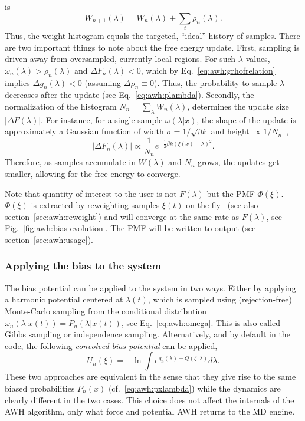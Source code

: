 is
\begin{equation}\label{eq:awh:w-update}
W_{n+1}(\lambda) = W_n(\lambda) + \sum_t\rho_n(\lambda).
\end{equation}
Thus, the weight histogram equals the targeted, ``ideal'' history of samples.
There are two important things to note about the free energy update.
First, sampling is driven away from oversampled, currently local regions.
For such $\lambda$ values, 
 $\omega_n(\lambda) > \rho_n(\lambda)$ and
$\Delta F_n(\lambda) < 0$,
which by Eq.~\ref{eq:awh:grhofrelation} implies 
$\Delta g_n(\lambda) < 0$
(assuming $\Delta \rho_n \equiv 0$).
Thus, the probability to sample  $\lambda$ decreases after the update (see Eq.~\ref{eq:awh:plambda}).
Secondly, the  normalization of the histogram $N_n=\sum_\lambda W_n(\lambda)$, determines the update size $|\Delta F(\lambda)|$.
For instance, for a single sample $\omega(\lambda|x)$, the shape of the  update is approximately a Gaussian function
of width $\sigma=1/\sqrt{\beta k}$ and height $\propto 1/N_n$~\cite{lindahl2014accelerated},
\begin{equation}\label{eq:awh:dfsize}
|\Delta F_n(\lambda)| \propto \frac{1}{N_n} e^{-\frac{1}{2} \beta k (\xi(x) - \lambda)^2}.
\end{equation}
Therefore, as samples accumulate in $W(\lambda)$ and $N_n$ grows, the updates get smaller, allowing for the free energy to converge.

Note that quantity of interest to the user is not $F(\lambda)$ but the PMF $\Phi(\xi)$.
$\Phi(\xi)$ is extracted by reweighting samples $\xi(t)$ on the fly~\cite{lindahl2014accelerated}
(see also section~\ref{sec:awh:reweight})
and  will converge at the same rate as $F(\lambda)$, see Fig.~\ref{fig:awh:bias-evolution}.
The PMF will be written to output (see section~\ref{sec:awh:usage}).

\subsubsection{Applying the bias to the system}
The bias potential can be applied to the system in two ways.
Either by applying a harmonic potential centered at $\lambda(t)$,
which is sampled using (rejection-free) Monte-Carlo sampling from the conditional distribution
$\omega_n(\lambda|x(t)) = P_n(\lambda|x(t))$, 
see Eq.~\ref{eq:awh:omega}.
This is also called Gibbs sampling or independence sampling.
Alternatively, and by default in the code, the following \emph{convolved bias potential} can be applied, 
\begin{equation}\label{eq:awh:biaspotential}
U_n(\xi) = -\ln \int e^{ g_n(\lambda) -Q(\xi,\lambda)} d \lambda.
\end{equation}
These two approaches are equivalent in the sense that they give rise to the same biased probabilities $P_n(x)$ (cf.\ \ref{eq:awh:pxlambda})
while the dynamics are clearly different in the two cases.
This choice does not affect the internals of the AWH algorithm, only what force and potential AWH returns to the MD engine.

